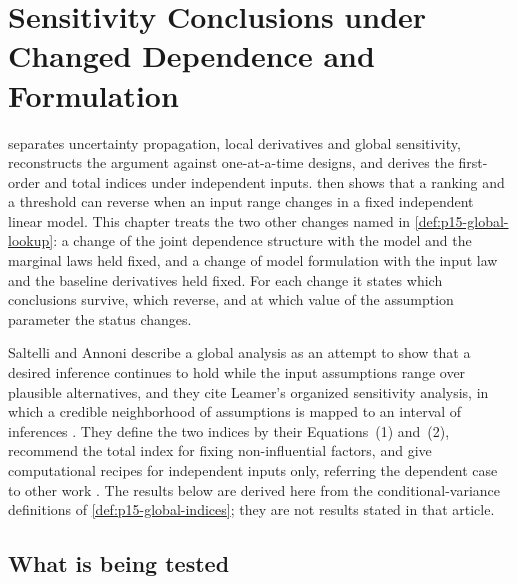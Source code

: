 \chapter{Sensitivity Conclusions under Changed Dependence and Formulation}
\label{sec:p15-w02b-p15-069-assumption-sensitivity}

 separates uncertainty propagation,
local derivatives and global sensitivity, reconstructs the argument against
one-at-a-time designs, and derives the first-order and total indices under
independent inputs.  then shows that a ranking
and a threshold can reverse when an input range changes in a fixed
independent linear model. This chapter treats the two other changes named
in \cref{def:p15-global-lookup}: a change of the joint dependence structure
with the model and the marginal laws held fixed, and a change of model
formulation with the input law and the baseline derivatives held fixed.
For each change it states which conclusions survive, which reverse, and at
which value of the assumption parameter the status changes.

Saltelli and Annoni describe a global analysis as an attempt to show that a
desired inference continues to hold while the input assumptions range over
plausible alternatives, and they cite Leamer's organized sensitivity
analysis, in which a credible neighborhood of assumptions is mapped to an
interval of inferences \cite[p.~1509, Section~2]{SaltelliAnnoni2010Sensitivity}.
They define the two indices by their Equations~(1) and~(2), recommend the
total index for fixing non-influential factors, and give computational
recipes for independent inputs only, referring the dependent case to other
work \cite[p.~1512, Section~5.4]{SaltelliAnnoni2010Sensitivity}.
The results below are derived here from the conditional-variance
definitions of \cref{def:p15-global-indices}; they are not results stated
in that article.

\section{What is being tested}

